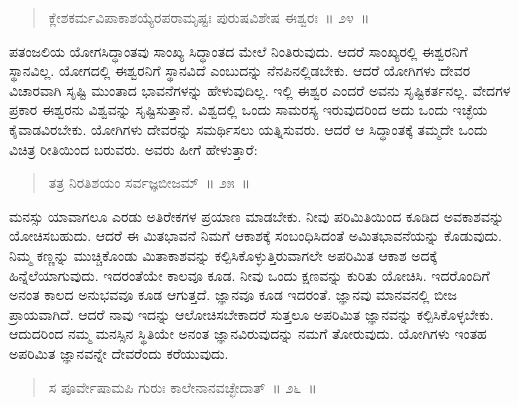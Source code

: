 \vspace{-0.35cm}


\vspace{-0.3cm}

\begin{verse}
ಕ್ಲೇಶಕರ್ಮವಿಪಾಕಾಶಯ್ಯೆರಪರಾಮೃಷ್ಟಃ ಪುರುಷವಿಶೇಷ ಈಶ್ವರಃ~॥ ೨೪~॥
\end{verse}

\vspace{-0.3cm}


ಪತಂಜಲಿಯ ಯೋಗಸಿದ್ಧಾಂತವು ಸಾಂಖ್ಯ ಸಿದ್ಧಾಂತದ ಮೇಲೆ ನಿಂತಿರುವುದು. ಆದರೆ ಸಾಂಖ್ಯರಲ್ಲಿ ಈಶ್ವರನಿಗೆ ಸ್ಥಾನವಿಲ್ಲ. ಯೋಗದಲ್ಲಿ ಈಶ್ವರನಿಗೆ ಸ್ಥಾನವಿದೆ ಎಂಬುದನ್ನು ನೆನಪಿನಲ್ಲಿಡಬೇಕು. ಆದರೆ ಯೋಗಿಗಳು ದೇವರ ವಿಚಾರವಾಗಿ ಸೃಷ್ಟಿ ಮುಂತಾದ ಭಾವನೆ\break ಗಳನ್ನು ಹೇಳುವುದಿಲ್ಲ. ಇಲ್ಲಿ ಈಶ್ವರ ಎಂದರೆ ಅವನು ಸೃಷ್ಟಿಕರ್ತನಲ್ಲ. ವೇದಗಳ ಪ್ರಕಾರ ಈಶ್ವರನು ವಿಶ್ವವನ್ನು ಸೃಷ್ಟಿಸುತ್ತಾನೆ. ವಿಶ್ವದಲ್ಲಿ ಒಂದು ಸಾಮರಸ್ಯ ಇರುವುದರಿಂದ ಅದು ಒಂದು ಇಚ್ಛೆಯ ಕೈವಾಡವಿರಬೇಕು. ಯೋಗಿಗಳು ದೇವರನ್ನು ಸಮರ್ಥಿಸಲು ಯತ್ನಿಸುವರು. ಆದರೆ ಆ ಸಿದ್ಧಾಂತಕ್ಕೆ ತಮ್ಮದೇ ಒಂದು ವಿಚಿತ್ರ ರೀತಿಯಿಂದ ಬರುವರು. ಅವರು ಹೀಗೆ ಹೇಳುತ್ತಾರೆ:

\vspace{-0.35cm}

\begin{verse}
ತತ್ರ ನಿರತಿಶಯಂ ಸರ್ವಜ್ಞಬೀಜಮ್​~॥ ೨೫~॥
\end{verse}

\vspace{-0.35cm}


ಮನಸ್ಸು ಯಾವಾಗಲೂ ಎರಡು ಅತಿರೇಕಗಳ ಪ್ರಯಾಣ ಮಾಡಬೇಕು. ನೀವು ಪರಿಮಿತಿಯಿಂದ ಕೂಡಿದ ಅವಕಾಶವನ್ನು ಯೋಚಿಸಬಹುದು. ಆದರೆ ಈ ಮಿತಭಾವನೆ ನಿಮಗೆ ಆಕಾಶಕ್ಕೆ ಸಂಬಂಧಿಸಿದಂತೆ ಅಮಿತಭಾವನೆಯನ್ನು ಕೊಡುವುದು. ನಿಮ್ಮ ಕಣ್ಣನ್ನು ಮುಚ್ಚಿಕೊಂಡು ಮಿತಾಕಾಶವನ್ನು ಕಲ್ಪಿಸಿಕೊಳ್ಳುತ್ತಿರುವಾಗಲೇ ಅಪರಿಮಿತ ಆಕಾಶ ಅದಕ್ಕೆ ಹಿನ್ನೆಲೆಯಾಗುವುದು. ಇದರಂತೆಯೇ ಕಾಲವೂ ಕೂಡ. ನೀವು ಒಂದು ಕ್ಷಣವನ್ನು ಕುರಿತು ಯೋಚಿಸಿ. ಇದರೊಂದಿಗೆ ಅನಂತ ಕಾಲದ ಅನುಭವವೂ ಕೂಡ ಆಗುತ್ತದೆ. ಜ್ಞಾನವೂ ಕೂಡ ಇದರಂತೆ. ಜ್ಞಾನವು ಮಾನವನಲ್ಲಿ ಬೀಜ ಪ್ರಾಯವಾಗಿದೆ. ಆದರೆ ನಾವು ಇದನ್ನು ಆಲೋಚಿಸಬೇಕಾದರೆ ಸುತ್ತಲೂ ಅಪರಿಮಿತ ಜ್ಞಾನವನ್ನು ಕಲ್ಪಿಸಿಕೊಳ್ಳಬೇಕು. ಆದುದರಿಂದ ನಮ್ಮ ಮನಸ್ಸಿನ ಸ್ಥಿತಿಯೇ ಅನಂತ ಜ್ಞಾನವಿರುವುದನ್ನು ನಮಗೆ ತೋರುವುದು. ಯೋಗಿಗಳು ಇಂತಹ ಅಪರಿಮಿತ ಜ್ಞಾನವನ್ನೇ ದೇವರೆಂದು ಕರೆಯುವುದು.

\vspace{-0.4cm}

\begin{verse}
ಸ ಪೂರ್ವೇಷಾಮಪಿ ಗುರುಃ ಕಾಲೇನಾನವಚ್ಛೇದಾತ್​~॥ ೨೬~॥
\end{verse}

